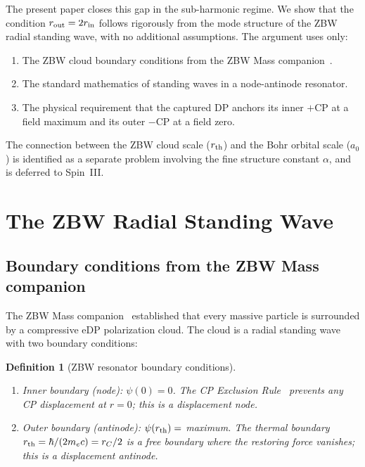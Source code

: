 \documentclass[12pt]{article}
\newtheorem{definition}[theorem]{Definition}
\newcommand{\rC}{r_C}
\newcommand{\rth}{r_{\rm th}}
\newcommand{\rin}{r_{\rm in}}
\newcommand{\rout}{r_{\rm out}}
\newcommand{\aBohr}{a_0}
\begin{document}
The present paper closes this gap in the sub-harmonic regime.  We
show that the condition $\rout = 2\rin$ follows rigorously from the
mode structure of the ZBW radial standing wave, with no additional
assumptions.  The argument uses only:
\begin{enumerate}[noitemsep]
  \item The ZBW cloud boundary conditions from the ZBW Mass
    companion~\cite{c4}.
  \item The standard mathematics of standing waves in a
    node-antinode resonator.
  \item The physical requirement that the captured DP anchors
    its inner $+$CP at a field maximum and its outer $-$CP at
    a field zero.
\end{enumerate}

The connection between the ZBW cloud scale ($\rth$) and the Bohr
orbital scale ($\aBohr$) is identified as a separate problem involving
the fine structure constant $\alpha$, and is deferred to Spin~III.

\section{The ZBW Radial Standing Wave}
\label{sec:ZBW_wave}

\subsection{Boundary conditions from the ZBW Mass companion}

The ZBW Mass companion~\cite{c4} established that every massive
particle is surrounded by a compressive eDP polarization cloud.
The cloud is a radial standing wave with two boundary conditions:

\begin{definition}[ZBW resonator boundary conditions]
\label{def:BC}
\quad
\begin{enumerate}[noitemsep]
  \item \emph{Inner boundary (node):} $\psi(0) = 0$.  The CP
    Exclusion Rule~\cite{c1} prevents any CP displacement at
    $r = 0$; this is a displacement node.
  \item \emph{Outer boundary (antinode):} $\psi(\rth) = $ maximum.
    The thermal boundary $\rth = \hbar/(2m_e c) = \rC/2$ is a
    free boundary where the restoring force vanishes; this is a
    displacement antinode.
\end{enumerate}
\end{definition}
\end{document}
